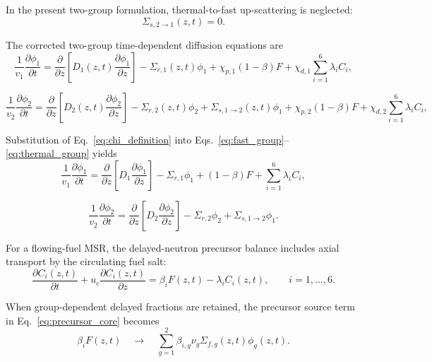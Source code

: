 \documentclass[a4paper,12pt]{article}
\begin{document}
In the present two-group formulation, thermal-to-fast up-scattering is
neglected:
\begin{equation}
\Sigma_{s,2\rightarrow 1}(z,t)=0.
\label{eq:no_upscatter}
\end{equation}

The corrected two-group time-dependent diffusion equations are
\begin{equation}
\frac{1}{v_1}
\frac{\partial \phi_1}{\partial t}
=
\frac{\partial}{\partial z}
\left[
D_1(z,t)
\frac{\partial \phi_1}{\partial z}
\right]
-
\Sigma_{r,1}(z,t)\phi_1
+
\chi_{p,1}(1-\beta)F
+
\chi_{d,1}
\sum_{i=1}^{6}\lambda_i C_i,
\label{eq:fast_group}
\end{equation}

\begin{equation}
\frac{1}{v_2}
\frac{\partial \phi_2}{\partial t}
=
\frac{\partial}{\partial z}
\left[
D_2(z,t)
\frac{\partial \phi_2}{\partial z}
\right]
-
\Sigma_{r,2}(z,t)\phi_2
+
\Sigma_{s,1\rightarrow 2}(z,t)\phi_1
+
\chi_{p,2}(1-\beta)F
+
\chi_{d,2}
\sum_{i=1}^{6}\lambda_i C_i,
\label{eq:thermal_group}
\end{equation}

Substitution of Eq.~\eqref{eq:chi_definition} into
Eqs.~\eqref{eq:fast_group}--\eqref{eq:thermal_group} yields
\begin{equation}
\frac{1}{v_1}
\frac{\partial \phi_1}{\partial t}
=
\frac{\partial}{\partial z}
\left[
D_1
\frac{\partial \phi_1}{\partial z}
\right]
-
\Sigma_{r,1}\phi_1
+
(1-\beta)F
+
\sum_{i=1}^{6}\lambda_i C_i,
\label{eq:fast_group_reduced}
\end{equation}

\begin{equation}
\frac{1}{v_2}
\frac{\partial \phi_2}{\partial t}
=
\frac{\partial}{\partial z}
\left[
D_2
\frac{\partial \phi_2}{\partial z}
\right]
-
\Sigma_{r,2}\phi_2
+
\Sigma_{s,1\rightarrow 2}\phi_1.
\label{eq:thermal_group_reduced}
\end{equation}

For a flowing-fuel MSR, the delayed-neutron precursor balance includes
axial transport by the circulating fuel salt:
\begin{equation}
\frac{\partial C_i(z,t)}{\partial t}
+
u_c
\frac{\partial C_i(z,t)}{\partial z}
=
\beta_i F(z,t)
-
\lambda_i C_i(z,t),
\qquad
i=1,\ldots,6.
\label{eq:precursor_core}
\end{equation}

When group-dependent delayed fractions are retained, the precursor source
term in Eq.~\eqref{eq:precursor_core} becomes
\begin{equation}
\beta_i F(z,t)
\quad \longrightarrow \quad
\sum_{g=1}^{2}
\beta_{i,g}\nu_g\Sigma_{f,g}(z,t)\phi_g(z,t).
\label{eq:group_dependent_beta}
\end{equation}
\end{document}
